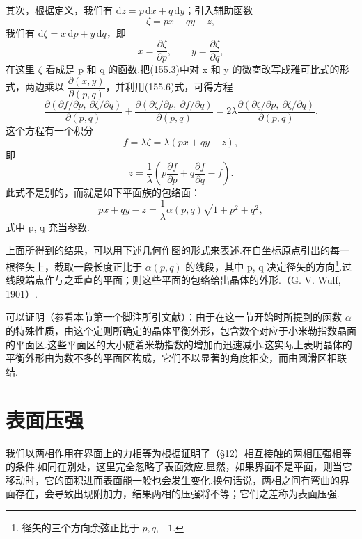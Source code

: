 其次，根据定义，我们有 $\mathrm{d}z=p\,\mathrm{d}x+q\,\mathrm{d}y$；引入辅助函数
\begin{equation}
  \zeta=px+qy-z,
\end{equation}
我们有 $\mathrm{d}\zeta=x\,\mathrm{d}p+y\,\mathrm{d}q$，即
\begin{equation}
  x=\frac{\partial\zeta}{\partial p},\qquad
  y=\frac{\partial\zeta}{\partial q},
\end{equation}
在这里 $\zeta$ 看成是 p 和 q 的函数.把(155.3)中对 x 和 y 的微商改写成雅可比式的形式，两边乘以 $\dfrac{\partial(x,y)}{\partial(p,q)}$，并利用(155.6)式，可得方程
\begin{equation*}
  \frac{\partial(\partial f/\partial p,\ \partial\zeta/\partial q)}{\partial(p,q)}
  +\frac{\partial(\partial\zeta/\partial p,\ \partial f/\partial q)}{\partial(p,q)}
  =2\lambda\frac{\partial(\partial\zeta/\partial p,\ \partial\zeta/\partial q)}{\partial(p,q)}.
\end{equation*}
这个方程有一个积分
\begin{equation*}
  f=\lambda\zeta=\lambda(px+qy-z),
\end{equation*}
即
\begin{equation}
  z=\frac{1}{\lambda}\left(p\frac{\partial f}{\partial p}
  +q\frac{\partial f}{\partial q}-f\right).
\end{equation}
此式不是别的，而就是如下平面族的包络面：
\begin{equation}
  px+qy-z=\frac{1}{\lambda}\alpha(p,q)\sqrt{1+p^2+q^2},
\end{equation}
式中 p, q 充当参数.

上面所得到的结果，可以用下述几何作图的形式来表述.在自坐标原点引出的每一根径矢上，截取一段长度正比于 $\alpha(p,q)$ 的线段，其中 p, q 决定径矢的方向\footnote{径矢的三个方向余弦正比于 $p,q,-1$.}.过线段端点作与之垂直的平面；则这些平面的包络给出晶体的外形.（G. V. Wulf, 1901）.

可以证明（参看本节第一个脚注所引文献）：由于在这一节开始时所提到的函数 $\alpha$ 的特殊性质，由这个定则所确定的晶体平衡外形，包含数个对应于小米勒指数晶面的平面区.这些平面区的大小随着米勒指数的增加而迅速减小.这实际上表明晶体的平衡外形由为数不多的平面区构成，它们不以显著的角度相交，而由圆滑区相联结.

\section{表面压强}

我们以两相作用在界面上的力相等为根据证明了（§12）相互接触的两相压强相等的条件.如同在别处，这里完全忽略了表面效应.显然，如果界面不是平面，则当它移动时，它的面积进而表面能一般也会发生变化.换句话说，两相之间有弯曲的界面存在，会导致出现附加力，结果两相的压强将不等；它们之差称为表面压强.

